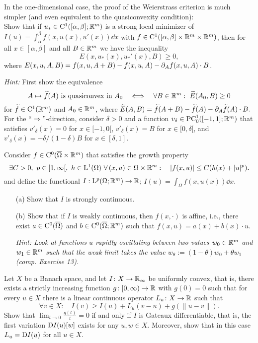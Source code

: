 \documentclass[12pt,a4paper]{article}
\begin{document}

\setcounter{AUFGABE}{14}


In the one-dimensional case, the proof of the Weierstrass criterion is much simpler 
(and even equivalent to the quasiconvexity condition):
\\
Show that if $u_*\in{\mathrm C}^1([\alpha,\beta];{\mathbb R}^m)$ is a strong local minimizer of $I(u)= \int_\alpha^\beta f(x,u(x),u'(x))\dd x$ with $f\in{\mathrm C}^1([\alpha,\beta]\times {\mathbb R}^m\times{\mathbb R}^m)$, 
then for all $x\in[\alpha,\beta]$ and all $B\in{\mathbb R}^m$
we have the inequality
\[
E(x,u_*(x),u_*'(x),B)\geq 0,
\]
where $E(x,u,A,B) = f(x,u,A+B) - f(x,u,A) - \partial_Af(x,u,A)\cdot B$.

\emph{Hint:} First show the equivalence
\[
A\mapsto \widetilde f (A)\text{ is quasiconvex in }A_0\quad\Longleftrightarrow\quad
\forall B\in {\mathbb R}^m:~\widetilde E(A_0,B) \geq 0
\]
for $\widetilde{f}\in{\mathrm C}^1({\mathbb R}^m)$ and $A_0\in{\mathbb R}^m$,
where $\widetilde E(A,B) = \widetilde{f}(A+B) -\widetilde{f}(A) -\partial_A\widetilde{f}(A)\cdot B.$
\\
For the ``$\Rightarrow$''-direction, consider $\delta>0$ and a function $v_\delta\in\mathrm{PC}^1_0([{-1},1];{\mathbb R}^m)$ 
that satisfies $v'_\delta(x) = 0$ for
$x\in [{-1},0[$, $v'_\delta(x) = B$ for $x\in[0,\delta[$, and 
$v'_\delta(x) = -\delta/(1{-}\delta)B$ for $x\in[\delta,1]$.

Consider $f\in{\mathrm C}^0(\overline\Omega\times{\mathbb R}^m)$ that
satisfies the growth property
\[
\exists C>0,~p\in[1,\infty[,~h\in{\mathrm L}^1(\Omega)~\forall \, (x,u)\in\Omega\times{\mathbb R}^m:\quad |f(x,u)|\leq C(h(x)+|u|^p).
\]
and define the functional
$I : {\mathrm L}^p(\Omega;{\mathbb R}^m) \to {\mathbb R}$; $I(u)= \int_\Omega f(x,u(x)) \dd x$.

\begin{itemize}
    \item[(a)] Show that $I$ is strongly continuous.
    \item[(b)] Show that if $I$ is weakly continuous, then $f(x,\cdot)$ is affine, i.e., there exist $a \in {\mathrm C}^0(\overline\Omega)$ and $b \in {\mathrm C}^0 (\overline\Omega; {\mathbb R}^m )$ 
    such that $f (x, u) = a(x) + b(x)\cdot u$.
    
    \emph{Hint:  Look at functions $u$ rapidly oscillating between two values $w_0\in{\mathbb R}^m$ and $w_1\in {\mathbb R}^m$ such that the weak limit takes the value $w_\theta := (1{-}\theta)w_0 + \theta w_1$ (comp. Exercise 13).}
\end{itemize}

Let $X$ be a Banach space, and let $I\colon X\to{\mathbb R}_\infty$
be uniformly convex, that is,
there exists a strictly increasing function 
$g\colon[0,\infty)\to{\mathbb R}$
with $g(0)=0$
such that
for every $u\in X$ there is a linear continuous operator 
$L_u\colon X\to{\mathbb R}$
such that
\[
\forall v\in X: \quad I(v)\geq I(u)+L_u(v-u)+g(\|u-v\|). 
\] 
Show that $\lim_{t\to0}\frac{g(t)}{t}=0$ if and only if 
$I$ is Gateaux differentiable,
that is, the first variation ${\mathrm D} I(u)[w]$ 
exists for any $u,w\in X$.
Moreover, show
that in this case $L_u={\mathrm D} I(u)$ for all $u\in X$.
\end{document}
